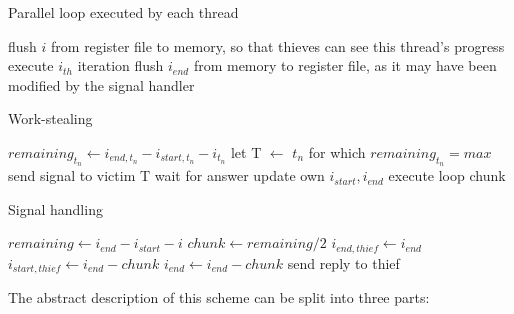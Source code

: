\documentclass{acm_proc_article-sp}
\begin{document}
\begin{algorithm}[h]
\caption{Parallel loop executed by each thread}
\label{alg:cooperative_loop}
\begin{algorithmic}
\State flush $i$ \Comment from register file to memory, so that
\State \Comment thieves can see this thread's progress
\State execute $i_{th}$ iteration
\State 
\State flush $i_{end}$ \Comment from memory to register file, as it may
\State \Comment have been modified by the signal handler
\EndFor
\end{algorithmic}
\end{algorithm}

\begin{algorithm}[h]
\caption{Work-stealing}
\label{alg:cooperative_steal}
\begin{algorithmic}
\State $remaining_{t_n} \gets i_{end,t_n} - i_{start,t_n} - i_{t_n}$
\EndFor
\State let T $\gets$ $t_n$ for which $remaining_{t_n} = max$
\State send signal to victim T
\State wait for answer
\State update own $i_{start}, i_{end}$
\State execute loop chunk
\end{algorithmic}
\end{algorithm}

\begin{algorithm}[h]
\caption{Signal handling}
\label{alg:cooperative_sighandler}
\begin{algorithmic}
\State $remaining \gets i_{end} - i_{start} - i$
\State $chunk \gets remaining/2$
\State $i_{end,thief} \gets i_{end}$
\State $i_{start,thief} \gets i_{end}-chunk$
\State $i_{end} \gets i_{end}-chunk$
\EndIf
\State send reply to thief
\end{algorithmic}
\end{algorithm}

The abstract description of this scheme can be split into three parts:
\end{document}
